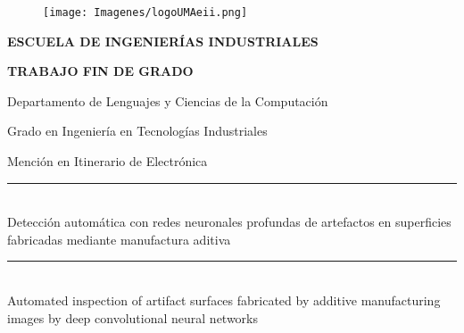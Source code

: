 \documentclass{report}
\begin{document}
\begin{titlepage}

 \begin{center}
\begin{figure}[hbpt]
    \vspace*{-1cm}
    \centering
    \texttt{[image: Imagenes/logoUMAeii.png]}
    \label{fig:my_label}
\end{figure}
\vspace*{4cm}
 

\vspace*{-2.9cm}	%
\Large\textbf{ESCUELA DE INGENIERÍAS INDUSTRIALES}

\vspace*{0.4cm}
\huge\textbf{TRABAJO FIN DE GRADO}

\vspace*{0.2cm}
\Large
Departamento de Lenguajes y Ciencias de la Computación
\vspace*{0cm}	

\begin{Large}
Grado en Ingeniería en Tecnologías Industriales

Mención en Itinerario de Electrónica
\end{Large}



\vspace*{-0cm}	

     \rule{\linewidth}{0.2 mm} \\[0.4 cm]
    
   
    \LARGE{Detección automática con redes neuronales profundas de artefactos en superficies fabricadas mediante manufactura aditiva} \\
    \rule{\linewidth}{0.1 mm} \\[0.4 cm]
   \large{Automated inspection of artifact surfaces fabricated by additive manufacturing images by deep convolutional neural networks}\\ 
    

\end{center}
\end{titlepage}
\end{document}
